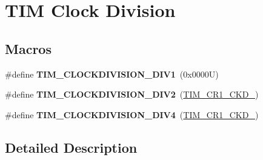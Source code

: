 \hypertarget{group___t_i_m___clock_division}{}\section{T\+IM Clock Division}
\label{group___t_i_m___clock_division}
\subsection*{Macros}
\begin{DoxyCompactItemize}
\item 
\mbox{\label{group___t_i_m___clock_division_ga309297ccd407a836ede6a42d4dc479c1}} 
\#define {\bfseries T\+I\+M\+\_\+\+C\+L\+O\+C\+K\+D\+I\+V\+I\+S\+I\+O\+N\+\_\+\+D\+I\+V1}~(0x0000\+U)
\item 
\mbox{\label{group___t_i_m___clock_division_gaf84a16da8edb80a3d8af91fbfc046181}} 
\#define {\bfseries T\+I\+M\+\_\+\+C\+L\+O\+C\+K\+D\+I\+V\+I\+S\+I\+O\+N\+\_\+\+D\+I\+V2}~(\hyperlink{group___peripheral___registers___bits___definition_ga458d536d82aa3db7d227b0f00b36808f}{T\+I\+M\+\_\+\+C\+R1\+\_\+\+C\+K\+D\+\_})
\item 
\mbox{\label{group___t_i_m___clock_division_ga7cac7491610ffc135ea9ed54f769ddbc}} 
\#define {\bfseries T\+I\+M\+\_\+\+C\+L\+O\+C\+K\+D\+I\+V\+I\+S\+I\+O\+N\+\_\+\+D\+I\+V4}~(\hyperlink{group___peripheral___registers___bits___definition_ga7ff2d6c2c350e8b719a8ad49c9a6bcbe}{T\+I\+M\+\_\+\+C\+R1\+\_\+\+C\+K\+D\+\_})
\end{DoxyCompactItemize}


\subsection{Detailed Description}
